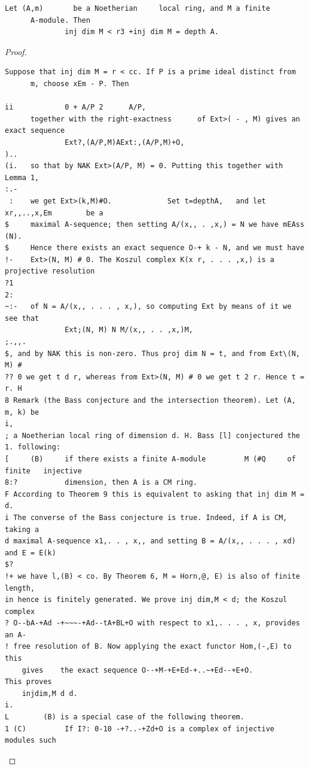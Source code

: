 \begin{theorem}\label{mcrt-auto-theorem-18-9}\uses{}
\begin{verbatim}
Let (A,m)       be a Noetherian     local ring, and M a finite
      A-module. Then
              inj dim M < r3 +inj dim M = depth A.
\end{verbatim}
\end{theorem}
\begin{proof}
\begin{verbatim}
Suppose that inj dim M = r < cc. If P is a prime ideal distinct from
      m, choose xEm - P. Then

ii            0 + A/P 2      A/P,
      together with the right-exactness      of Ext>( - , M) gives an exact sequence
              Ext?,(A/P,M)AExt:,(A/P,M)+O,
)..
(i.   so that by NAK Ext>(A/P, M) = 0. Putting this together with Lemma 1,
:.-
 :    we get Ext>(k,M)#O.             Set t=depthA,   and let xr,,..,x,Em        be a
$     maximal A-sequence; then setting A/(x,, . ,x,) = N we have mEAss (N).
$     Hence there exists an exact sequence O-+ k - N, and we must have
!-    Ext>(N, M) # 0. The Koszul complex K(x r, . . . ,x,) is a projective resolution
?1
2:
~:-   of N = A/(x,, . . . , x,), so computing Ext by means of it we see that
              Ext;(N, M) N M/(x,, . . ,x,)M,
;.,,.
$, and by NAK this is non-zero. Thus proj dim N = t, and from Ext\(N, M) #
?? 0 we get t d r, whereas from Ext>(N, M) # 0 we get t 2 r. Hence t = r. H
8 Remark (the Bass conjecture and the intersection theorem). Let (A, m, k) be
i,
; a Noetherian local ring of dimension d. H. Bass [l] conjectured the
1. following:
[     (B)     if there exists a finite A-module         M (#Q     of finite   injective
8:?           dimension, then A is a CM ring.
F According to Theorem 9 this is equivalent to asking that inj dim M = d.
i The converse of the Bass conjecture is true. Indeed, if A is CM, taking a
d maximal A-sequence x1,. . , x,, and setting B = A/(x,, . . . , xd) and E = E(k)
$?
!+ we have l,(B) < co. By Theorem 6, M = Horn,@, E) is also of finite length,
in hence is finitely generated. We prove inj dim,M < d; the Koszul complex
? O--bA-+Ad -+~~~-+Ad--tA+BL+O with respect to x1,. . . , x, provides an A-
! free resolution of B. Now applying the exact functor Hom,(-,E) to this
    gives    the exact sequence O--+M-+E+Ed-+..~+Ed--+E+O.            This proves
    injdim,M d d.
i.
L        (B) is a special case of the following theorem.
1 (C)         If I?: 0-10 -+?..-+Zd+O is a complex of injective modules such

\end{verbatim}
\end{proof}
